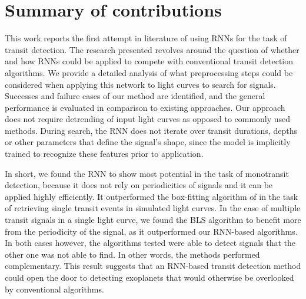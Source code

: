 
\section{Summary of contributions}
\label{sec:contributions}

This work reports the first attempt in literature of using RNNs for the task of transit detection. The research presented revolves around the question of whether and how RNNs could be applied to compete with conventional transit detection algorithms. We provide a detailed analysis of what preprocessing steps could be considered when applying this network to light curves to search for signals. Successes and failure cases of our method are identified, and the general performance is evaluated in comparison to existing approaches. Our approach does not require detrending of input light curves as opposed to commonly used methods. During search, the RNN does not iterate over transit durations, depths or other parameters that define the signal's shape, since the model is implicitly trained to recognize these features prior to application.

In short, we found the RNN to show most potential in the task of monotransit detection, because it does not rely on periodicities of signals and it can be applied highly efficiently. It outperformed the box-fitting algorithm of \cite{foreman2016population} in the task of retrieving single transit events in simulated light curves. In the case of multiple transit signals in a single light curve, we found the BLS algorithm to benefit more from the periodicity of the signal, as it outperformed our RNN-based algorithms. In both cases however, the algorithms tested were able to detect signals that the other one was not able to find. In other words, the methods performed complementary. This result suggests that an RNN-based transit detection method could open the door to detecting exoplanets that would otherwise be overlooked by conventional algorithms.